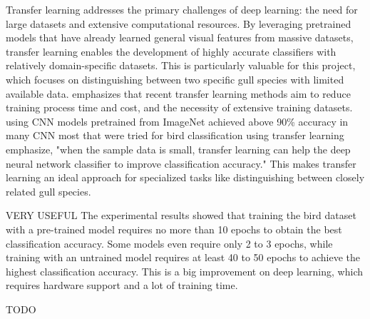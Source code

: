 \documentclass[a4paper,12pt]{report}
\begin{document}

Transfer learning addresses the primary challenges of deep learning: the need for large datasets and extensive computational resources. By leveraging pretrained models that have already learned general visual features from massive datasets, transfer learning enables the development of highly accurate classifiers with relatively domain-specific datasets. This is particularly valuable for this project, which focuses on distinguishing between two specific gull species with limited available data. \citep{iman2022review} emphasizes that recent transfer learning methods aim to reduce training process time and cost, and the necessity of extensive training datasets. \citep{transferln97} using CNN models pretrained from ImageNet achieved above 90\% accuracy in many CNN most that were tried for bird classification using transfer learning emphasize, "when the sample data is small, transfer learning can help the deep neural network classifier to improve classification accuracy." This makes transfer learning an ideal approach for specialized tasks like distinguishing between closely related gull species.


VERY USEFUL
The experimental results showed that training the bird dataset with a pre-trained model requires no more than
10 epochs to obtain the best classification accuracy. Some models even require only 2 to 3 epochs, while
training with an untrained model requires at least 40 to 50 epochs to achieve the highest classification
accuracy. This is a big improvement on deep learning, which requires hardware support and a lot of training
time.


TODO \citep{kornblith2019better} 


\end{document}
